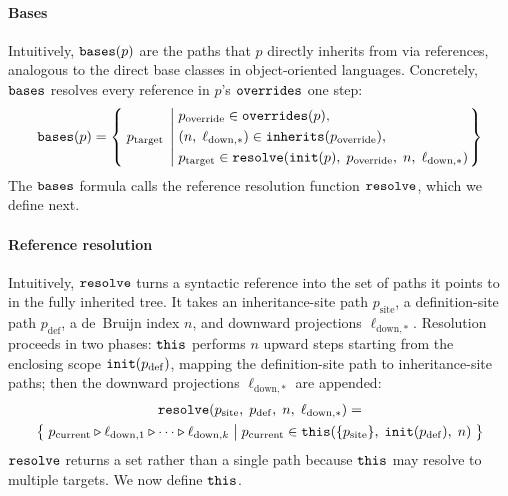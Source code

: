 \paragraph{Bases}
Intuitively, $\mathtt{bases}(p)$ are the paths that $p$ directly
inherits from via references, analogous to the direct base
classes in object-oriented languages.
Concretely, $\mathtt{bases}$ resolves every reference in
$p$'s $\mathtt{overrides}$ one step:
\begin{equation}\label{eq:bases}
  \mathtt{bases}(p) =
  \left\{\; p_{\mathrm{target}} \;\left|\;
    \begin{aligned}
      &p_{\mathrm{override}} \in \mathtt{overrides}(p), \\
      &(n,\; \ell_{\mathrm{down},*}) \in \mathtt{inherits}(p_{\mathrm{override}}), \\
      &p_{\mathrm{target}} \in \mathtt{resolve}(\mathtt{init}(p),\; p_{\mathrm{override}},\; n,\; \ell_{\mathrm{down},*})
    \end{aligned}
  \right.\right\}
\end{equation}
The $\mathtt{bases}$ formula calls the reference resolution function $\mathtt{resolve}$, which we define next.

\paragraph{Reference resolution}
Intuitively, $\mathtt{resolve}$ turns a syntactic reference into the
set of paths it points to in the fully inherited tree.
It takes an inheritance-site path $p_{\mathrm{site}}$,
a definition-site path $p_{\mathrm{def}}$,
a de~Bruijn index $n$,
and downward projections $\ell_{\mathrm{down},*}$.
Resolution proceeds in two phases:
$\mathtt{this}$ performs $n$ upward steps
starting from the enclosing scope $\mathtt{init}(p_{\mathrm{def}})$,
mapping the definition-site path to inheritance-site paths;
then the downward projections $\ell_{\mathrm{down},*}$ are appended:
\begin{multline}\label{eq:resolve}
  \mathtt{resolve}(p_{\mathrm{site}},\; p_{\mathrm{def}},\; n,\; \ell_{\mathrm{down},*})
  = \\
  \bigl\{\;
    p_{\mathrm{current}} \mathbin{\triangleright} \ell_{\mathrm{down},1} \mathbin{\triangleright} \cdots \mathbin{\triangleright} \ell_{\mathrm{down},k}
    \;\big|\;
    p_{\mathrm{current}} \in
    \mathtt{this}(\{p_{\mathrm{site}}\},\; \mathtt{init}(p_{\mathrm{def}}),\; n)
  \;\bigr\}
\end{multline}
$\mathtt{resolve}$ returns a set rather than a single path because
$\mathtt{this}$ may resolve to multiple targets.
We now define $\mathtt{this}$.

